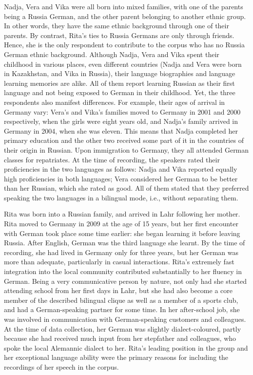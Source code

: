 Nadja, Vera and Vika were all born into mixed families, with one of the parents being a Russia German, and the other parent belonging to another ethnic group. In other words, they have the same ethnic background through one of their parents. By contrast, Rita's ties to Russia Germans are only through friends. Hence, she is the only respondent to contribute to the corpus who has no Russia German ethnic background. Although Nadja, Vera and Vika spent their childhood in various places, even different countries (Nadja and Vera were born in Kazakhstan, and Vika in Russia), their language biographies and language learning memories are alike. All of them report learning Russian as their first language and not being exposed to German in their childhood. Yet, the three respondents also manifest differences. For example, their ages of arrival in Germany vary: Vera's and Vika's families moved to Germany in 2001 and 2000 respectively, when the girls were eight years old, and Nadja's family arrived in Germany in 2004, when she was eleven. This means that Nadja completed her primary education and the other two received some part of it in the countries of their origin in Russian. Upon immigration to Germany, they all attended German classes for repatriates. At the time of recording, the speakers rated their proficiencies in the two languages as follows: Nadja and Vika reported equally high proficiencies in both languages; Vera considered her German to be better than her Russian, which she rated as good. All of them stated that they preferred speaking the two languages in a bilingual mode, i.e., without separating them.

Rita was born into a Russian family, and arrived in Lahr following her mother. Rita moved to Germany in 2009 at the age of 15 years, but her first encounter with German took place some time earlier: she began learning it before leaving Russia. After English, German was the third language she learnt. By the time of recording, she had lived in Germany only for three years, but her German was more than adequate, particularly in casual interactions. Rita's extremely fast integration into the local community contributed substantially to her fluency in German. Being a very communicative person by nature, not only had she started attending school from her first days in Lahr, but she had also become a core member of the described bilingual clique as well as a member of a sports club, and had a German-speaking partner for some time. In her after-school job, she was involved in communication with German-speaking customers and colleagues. At the time of data collection, her German was slightly dialect-coloured, partly because she had received much input from her stepfather and colleagues, who spoke the local Alemannic dialect to her. Rita's leading position in the group and her exceptional language ability were the primary reasons for including the recordings of her speech in the corpus.

